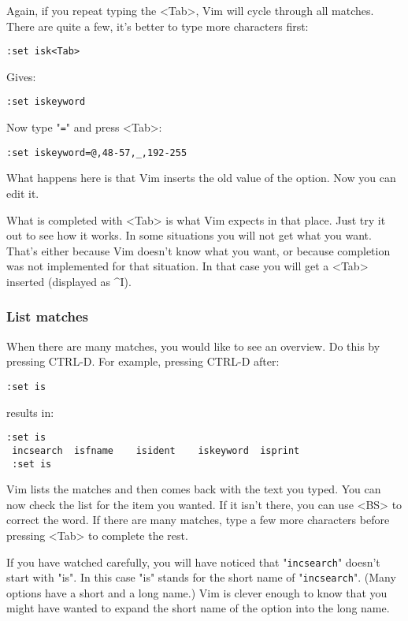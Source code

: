 Again, if you repeat typing the <Tab>, Vim will cycle through all matches.
There are quite a few, it's better to type more characters first:

\begin{Verbatim}[samepage=true]
 :set isk<Tab>
\end{Verbatim}

Gives:

\begin{Verbatim}[samepage=true]
 :set iskeyword
\end{Verbatim}

Now type "\verb!=!" and press <Tab>:

\begin{Verbatim}[samepage=true]
 :set iskeyword=@,48-57,_,192-255
\end{Verbatim}

What happens here is that Vim inserts the old value of the option.
Now you can edit it.

What is completed with <Tab> is what Vim expects in that place.
Just try it out to see how it works.
In some situations you will not get what you want.
That's either because Vim doesn't know what you want, or because completion was not implemented for that situation.
In that case you will get a <Tab> inserted (displayed as \textasciicircum I).
\subsubsection{List matches}
When there are many matches, you would like to see an overview.
Do this by pressing CTRL-D.
For example, pressing CTRL-D after:

\begin{Verbatim}[samepage=true]
 :set is
\end{Verbatim}

results in:

\begin{Verbatim}[samepage=true]
 :set is
 incsearch  isfname    isident    iskeyword  isprint
 :set is
\end{Verbatim}

Vim lists the matches and then comes back with the text you typed.
You can now check the list for the item you wanted.
If it isn't there, you can use <BS> to correct the word.
If there are many matches, type a few more characters before pressing <Tab> to complete the rest.

If you have watched carefully, you will have noticed that "\verb!incsearch!" doesn't start with "is".
In this case "is" stands for the short name of "\verb!incsearch!".
(Many options have a short and a long name.)  Vim is clever enough to know that you might have wanted to expand the short name of the option into the long name.
